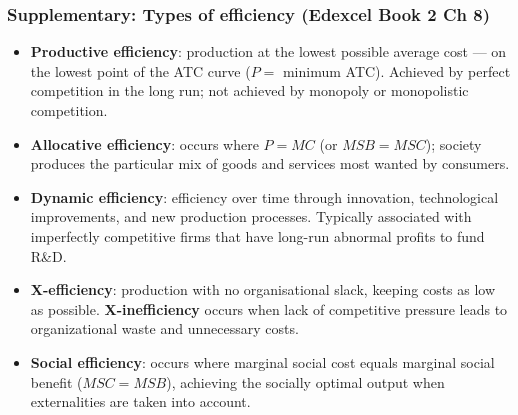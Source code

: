 \documentclass[a4paper,12pt]{article}
\newcommand{\needbold}[1]{\textcolor{red!70!black}{\textbf{#1}}}
\begin{document}
\subsubsection*{Supplementary: Types of efficiency (Edexcel Book 2 Ch 8)}
\begin{itemize}
  \item \needbold{Productive efficiency}: production at the lowest possible average cost --- on the lowest point of the ATC curve ($P = $ minimum ATC). Achieved by perfect competition in the long run; not achieved by monopoly or monopolistic competition.
  \item \needbold{Allocative efficiency}: occurs where $P = MC$ (or $MSB = MSC$); society produces the particular mix of goods and services most wanted by consumers.
  \item \needbold{Dynamic efficiency}: efficiency over time through innovation, technological improvements, and new production processes. Typically associated with imperfectly competitive firms that have long-run abnormal profits to fund R\&D.
  \item \needbold{X-efficiency}: production with no organisational slack, keeping costs as low as possible. \textbf{X-inefficiency} occurs when lack of competitive pressure leads to organizational waste and unnecessary costs.
  \item \needbold{Social efficiency}: occurs where marginal social cost equals marginal social benefit ($MSC = MSB$), achieving the socially optimal output when externalities are taken into account.
\end{itemize}
\end{document}
